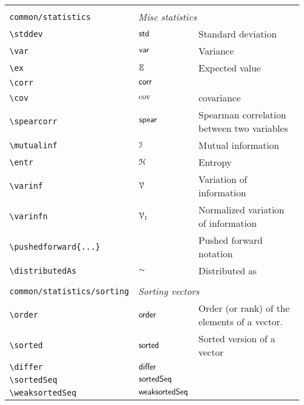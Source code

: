 \begin{longtable}{lll}
  &  & \\ 
 {\color[rgb]{0.5,0.5,0.5}\texttt{common/statistics}} & \multicolumn{2}{l}{\emph{Misc statistics}}\\ 
 \hline
{\color[rgb]{0.5,0.5,0.5}\texttt{\textbackslash stddev}} & $\mathsf{std}$ &  Standard deviation\\ 
 {\color[rgb]{0.5,0.5,0.5}\texttt{\textbackslash var}} & $\mathsf{var}$ &  Variance\\ 
 {\color[rgb]{0.5,0.5,0.5}\texttt{\textbackslash ex}} & $\mathbb{E}$ &  Expected value\\ 
 {\color[rgb]{0.5,0.5,0.5}\texttt{\textbackslash corr}} & $\mathsf{corr}$ & \\ 
 {\color[rgb]{0.5,0.5,0.5}\texttt{\textbackslash cov}} & $\mathrm{cov}$ &  covariance\\ 
 {\color[rgb]{0.5,0.5,0.5}\texttt{\textbackslash spearcorr}} & $\mathsf{spear}$ &  Spearman correlation between two variables\\ 
 {\color[rgb]{0.5,0.5,0.5}\texttt{\textbackslash mutualinf}} & $\mathcal{I}$ &  Mutual information\\ 
 {\color[rgb]{0.5,0.5,0.5}\texttt{\textbackslash entr}} & $\mathcal{H}$ &  Entropy\\ 
 {\color[rgb]{0.5,0.5,0.5}\texttt{\textbackslash varinf}} & $\mathcal{V}$ &  Variation of information\\ 
 {\color[rgb]{0.5,0.5,0.5}\texttt{\textbackslash varinfn}} & $\mathcal{V}_{1}$ &  Normalized variation of information\\ 
 {\color[rgb]{0.5,0.5,0.5}\texttt{\textbackslash pushedforward\{...\}}} &  &  Pushed forward notation\\ 
 {\color[rgb]{0.5,0.5,0.5}\texttt{\textbackslash distributedAs}} & $\sim$ &  Distributed as\\ 
  &  & \\ 
 {\color[rgb]{0.5,0.5,0.5}\texttt{common/statistics/sorting}} & \multicolumn{2}{l}{\emph{Sorting vectors}}\\ 
 \hline
{\color[rgb]{0.5,0.5,0.5}\texttt{\textbackslash order}} & $\mathsf{order}$ &  Order (or rank) of the elements of a vector.\\ 
 {\color[rgb]{0.5,0.5,0.5}\texttt{\textbackslash sorted}} & $\mathsf{sorted}$ &  Sorted version of a vector\\ 
 {\color[rgb]{0.5,0.5,0.5}\texttt{\textbackslash differ}} & $\mathsf{differ}$ & \\ 
 {\color[rgb]{0.5,0.5,0.5}\texttt{\textbackslash sortedSeq}} & $\mathsf{sortedSeq}$ & \\ 
 {\color[rgb]{0.5,0.5,0.5}\texttt{\textbackslash weaksortedSeq}} & $\mathsf{weaksortedSeq}$ & \\ 

\end{longtable}
